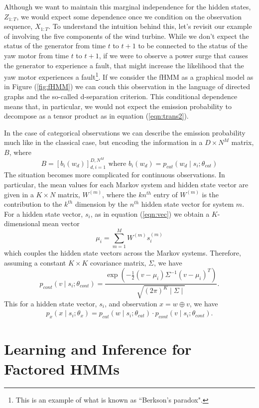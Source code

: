 \documentclass{amsart}
\begin{document}
Although we want to maintain this marginal independence for the hidden states, 
$Z_{1:T}$, we would expect some dependence once we condition on the observation 
sequence, $X_{1:T}$.  To understand the intuition behind this, let's revisit our 
example of involving the five components of the wind turbine.  While we don't 
expect the status of the generator from time $t$ to $t+1$ to be connected to 
the status of the yaw motor from time $t$ to $t+1$, if we were to observe a 
power surge that causes the generator to experience a fault, that might 
increase the likelihood that the yaw motor experiences a fault\footnote{This is 
an example of what is known as ``Berkson's paradox".}.  If we consider 
the fHMM as a graphical model as in Figure (\ref{fig:fHMM}) we can couch this 
observation in the language of directed graphs and the so-called d-separation 
criterion. This conditional dependence means that, in particular, we would not expect the 
emission probability to decompose as a tensor product as in equation (\ref{eqn:trans2}). 

In the case of categorical observations we can 
describe the emission probability much like in the classical case, but encoding 
the information in a $D\times N^M$ matrix, $B$, where 
\[
B = \left[b_{i}(w_d)\right]_{d,i=1}^{D,N^M} \text{ where }b_{i}(w_d) = p_{cat}(w_d\mid 
s_i;\theta_{cat})
\]
The situation becomes more complicated for continuous observations.  In 
particular, the mean values for each Markov system and hidden state vector are 
given in a $K\times N$ matrix, $W^{(m)}$, where the $kn^{th}$ entry 
of $W^{(m)}$ is the contribution to the $k^{th}$ dimension by the $n^{th}$ 
hidden state vector for system $m$. For a hidden state vector, $s_i$, as in 
equation (\ref{eqn:vec}) we obtain a $K$-dimensional mean vector
\[
\mu_i = \sum_{m=1}^M W^{(m)}s_i^{(m)}
\]
which couples the hidden state vectors across the Markov systems.
Therefore, assuming a constant $K\times K$ covariance matrix, $\Sigma$, we have 
\[
p_{cont}(v\mid s_i;\theta_{cont}) = 
\frac{\exp\left(-\frac{1}{2}\left(v-\mu_i\right)\Sigma^{-1}\left(v-\mu_i\right)^T\right)}{\sqrt{(2\pi)^K\mid \Sigma\mid}}.
\]
This for a hidden state vector, $s_i$, and observation $x=w\oplus v$, we have
\begin{eqnarray}
p_x(x\mid s_i; \theta_x) = p_{cat}(w\mid 
s_i;\theta_{cat})\cdot p_{cont}(v\mid s_i;\theta_{cont}) .
\end{eqnarray}


\section{Learning and Inference for Factored HMMs}
\end{document}
